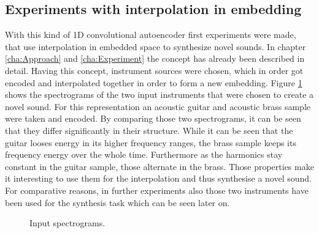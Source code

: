 \subsection{Experiments with interpolation in embedding}
With this kind of 1D convolutional autoencoder first experiments were made, that use interpolation in embedded space to synthesize novel sounds. In chapter \ref{cha:Approach} and \ref{cha:Experiment} the concept has already been described in detail. Having this concept, instrument sources were chosen, which in order got encoded and interpolated together in order to form a new embedding. Figure \ref{fig:res_1D_input_interpolation} shows the spectrograms of the two input instruments that were chosen to create a novel sound. For this representation an acoustic guitar and acoustic brass sample were taken and encoded. By comparing those two spectrograms, it can be seen that they differ significantly in their structure. While it can be seen that the guitar looses energy in its higher frequency ranges, the brass sample keeps its frequency energy over the whole time. Furthermore as the harmonics stay constant in the guitar sample, those alternate in the brass. Those properties make it interesting to use them for the interpolation and thus synthesise a novel sound. For comparative reasons, in further experiments also those two instruments have been used for the synthesis task which can be seen later on.

\begin{figure}[htb!]
    \centering
    \caption{Input spectrograms.}
    \label{fig:res_1D_input_interpolation}
\end{figure}

